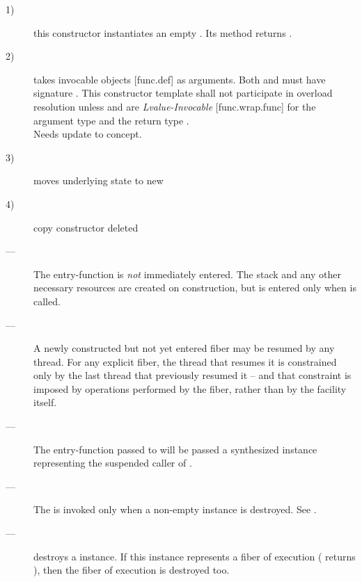\begin{description}
    \item[1)] this constructor instantiates an empty \fiber. Its  method
              returns .
    \item[2)] takes invocable objects [func.def] as arguments. Both 
              and  must have signature 
              . This constructor template
              shall not participate in overload resolution unless  and 
              are \emph{Lvalue-Invocable} [func.wrap.func] for the argument
              type  and the return type \fiber.\\
               Needs update to  concept.
    \item[3)] moves underlying state to new \fiber
    \item[4)] copy constructor deleted
\end{description}

\remarks
\begin{description}
    \item[---] The entry-function  is \emph{not} immediately entered.
              The stack and any other necessary resources are created
              on construction, but  is entered
              only when \allresume is called.
    \item[---] A newly constructed but not yet entered fiber may be resumed by
              any thread. For any explicit fiber, the thread that resumes it
              is constrained only by the last thread that previously resumed
              it -- and that constraint is imposed by operations performed by
              the fiber, rather than by the \fiber facility itself.
    \item[---] The entry-function  passed to \fiber
              will be passed a synthesized \fiber instance representing the
              suspended caller of \allresume.
    \item[---] The \cancelfn {} is invoked only when a non-empty
              \fiber instance is destroyed. See .
\end{description}


\effects
\begin{description}
    \item[---] destroys a \fiber instance. If this instance represents a fiber
              of execution ( returns ), then the fiber of
              execution is destroyed too.
\end{description}


